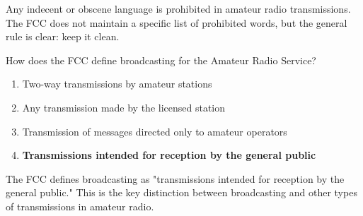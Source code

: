 Any indecent or obscene language is prohibited in amateur radio transmissions. The FCC does not maintain a specific list of prohibited words, but the general rule is clear: keep it clean.

\begin{tcolorbox}[colback=gray!10!white,colframe=black!75!black,title={T1D10}]
How does the FCC define broadcasting for the Amateur Radio Service?
\begin{enumerate}[label=\Alph*),noitemsep]
    \item Two-way transmissions by amateur stations
    \item Any transmission made by the licensed station
    \item Transmission of messages directed only to amateur operators
    \item \textbf{Transmissions intended for reception by the general public}
\end{enumerate}
\end{tcolorbox}

The FCC defines broadcasting as "transmissions intended for reception by the general public." This is the key distinction between broadcasting and other types of transmissions in amateur radio.
